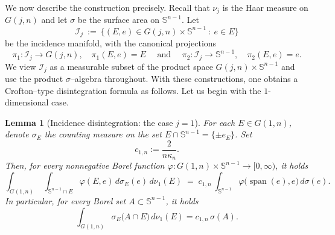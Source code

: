 \documentclass[11pt]{article}
\newtheorem{lemma}[theorem]{Lemma}
\theoremstyle{definition}
\numberwithin{equation}{section}
\newcommand{\Sph}{\mathbb{S}}        %
\begin{document}
\medskip

We now describe the construction precisely.
Recall that $\nu_j$ is the Haar measure on $G(j, n)$ and let $\sigma$ be the surface area on $\Sph^{n - 1}$.
Let
\[
  \mathcal I_j\ :=\ \{(E, e)\in G(j,n)\times \Sph^{n-1} ~:~ e\in E\}
\]
be the incidence manifold, with the canonical projections
\[
  \pi_1:\mathcal I_j\to G(j,n),\quad \pi_1(E, e) = E
  \quad \text{ and } \quad
  \pi_2:\mathcal I_j\to \Sph^{n-1},\quad \pi_2(E, e) = e.
\]
We view $\mathcal I_j$ as a measurable subset of the product space $G(j,n)\times \Sph^{n-1}$ and
use the product $\sigma$--algebra throughout.
With these constructions, one obtains a Crofton--type disintegration formula as follows.
Let us begin with the $1$-dimensional case.

\begin{lemma}[Incidence disintegration: the case \(j=1\)]\label{lem:incidence-1}
For each $E \in G(1, n)$, denote $\sigma_E$ the counting measure on the set $E \cap \mathbb S^{n - 1} = \{ \pm e_E \}$.
Set
\[
    c_{1, n} := \dfrac{2}{n \kappa_n}.
\]
Then, for every nonnegative Borel function
\(\varphi:G(1,n)\times\mathbb S^{n-1}\to[0,\infty)\), it holds
\begin{equation}\label{eq:j1-functional}
\int_{G(1,n)} \;\int_{\mathbb S^{n-1}\cap E} \varphi(E, e)\,d\sigma_E(e)\,d\nu_1(E)
\;=\;
c_{1,n}\,\int_{\mathbb S^{n-1}} \varphi\bigl(\operatorname{span}(e),e\bigr)\,d\sigma(e).
\end{equation}
In particular, for every Borel set \(A\subset\mathbb S^{n-1}\), it holds
\begin{equation}\label{eq:j1-incidence}
\int_{G(1,n)} \sigma_E\bigl(A\cap E \bigr)\,d\nu_1(E)
= c_{1,n}\,\sigma(A).
\end{equation}
\end{lemma}
\end{document}
